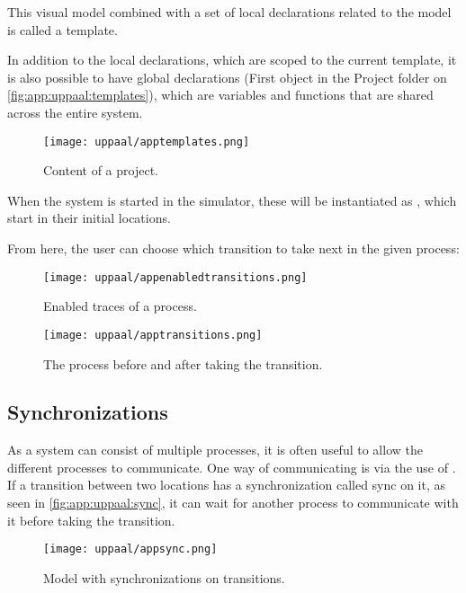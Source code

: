 This visual model combined with a set of local declarations related to the model is called a template.

In addition to the local declarations, which are scoped to the current template, it is also possible to have global declarations (First object in the Project folder on \autoref{fig:app:uppaal:templates}), which are variables and functions that are shared across the entire system.

\begin{figure}[H]
    \centering
    \texttt{[image: uppaal/apptemplates.png]}
    \caption{Content of a \uppaal project.}
    \label{fig:app:uppaal:templates}
\end{figure}

When the system is started in the simulator, these  will be instantiated as , which start in their initial locations.

From here, the user can choose which transition to take next in the given process:

\begin{figure}[H]
    \centering
    \texttt{[image: uppaal/appenabledtransitions.png]}
    \caption{Enabled traces of a process.}
    \label{fig:app:uppaal:enabledtransitions}
\end{figure}

\begin{figure}[H]
    \centering
    \texttt{[image: uppaal/apptransitions.png]}
    \caption{The process before and after taking the transition.}
    \label{fig:app:uppaal:transitions}
\end{figure}

\subsection{Synchronizations}
As a \uppaal system can consist of multiple processes, it is often useful to allow the different processes to communicate.
One way of communicating is via the use of .
If a transition between two locations has a synchronization called sync on it, as seen in \autoref{fig:app:uppaal:sync}, it can wait for another process to communicate with it before taking the transition.

\begin{figure}[H]
    \centering
    \texttt{[image: uppaal/appsync.png]}
    \caption{Model with synchronizations on transitions.}
    \label{fig:app:uppaal:sync}
\end{figure}

